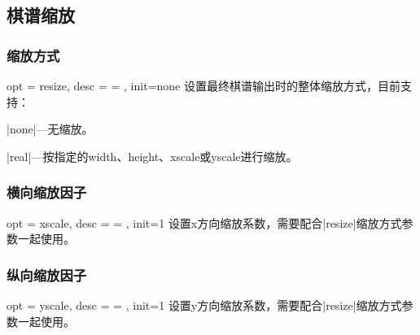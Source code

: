 \documentclass[full]{l3doc}
\begin{document}
\begin{documentation}
\bigskip

\subsection{棋谱缩放}

\subsubsection{缩放方式}

\begin{option}{ opt = resize, desc = {= }, init=none }
  设置最终棋谱输出时的整体缩放方式，目前支持：
\end{option}

  \begin{Description}[a]
    \item |none|---无缩放。
    \item |real|---按指定的width、height、xscale或yscale进行缩放。
  \end{Description}

\bigskip

\subsubsection{横向缩放因子}

\begin{option}{ opt = xscale, desc = {= }, init=1 }
  设置x方向缩放系数，需要配合|resize|缩放方式参数一起使用。
\end{option}

\begin{SideBySideExample}[frame=single,numbers=left,
                xrightmargin=.48\linewidth,gobble=2]
  \centering
  \cchessboard[resize=real, xscale=0.5]
\end{SideBySideExample}


\bigskip

\subsubsection{纵向缩放因子}

\begin{option}{ opt = yscale, desc = {= }, init=1 }
  设置y方向缩放系数，需要配合|resize|缩放方式参数一起使用。
\end{option}

\begin{SideBySideExample}[frame=single,numbers=left,
                xrightmargin=.70\linewidth,gobble=2]
  \centering
  \cchessboard[%
    resize=real,
    yscale=0.5]
\end{SideBySideExample}


\end{documentation}
\end{document}
